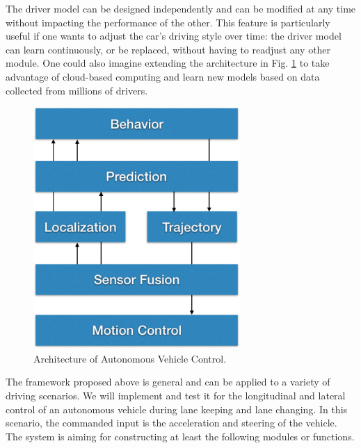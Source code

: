 The driver model can be designed independently and can be modified at any time without impacting the performance of the other. This feature is particularly useful if one wants to adjust the car's driving style over time: the driver model can learn continuously, or be replaced, without having to readjust any other module. One could also imagine extending the architecture in Fig. \ref{fig:proposed-architecture} to take advantage of cloud-based computing and learn new models based on data collected from millions of drivers.

\begin{figure}[h]
\centering
\includegraphics[width=0.7\textwidth]{figs/ch3/auto-car-flowchart}
\caption{Architecture of Autonomous Vehicle Control.}
\label{fig:proposed-architecture}
\end{figure}

The framework proposed above is general and can be applied to a variety of driving scenarios. We will implement and test it for the longitudinal and lateral control of an autonomous vehicle during lane keeping and lane changing. In this scenario, the commanded input is the acceleration and steering of the vehicle. The system is aiming for constructing at least the following modules or functions.

